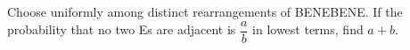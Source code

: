 Choose uniformly among distinct rearrangements of BENEBENE. If the probability that no two Es are adjacent is $\dfrac{a}{b}$ in lowest terms, find $a+b$.
